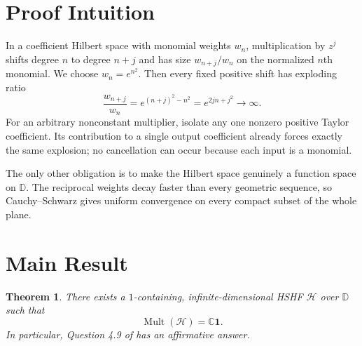 \documentclass[11pt]{article}
\newtheorem{theorem}{Theorem}
\theoremstyle{definition}
\theoremstyle{remark}
\newcommand{\C}{\mathbb C}
\newcommand{\D}{\mathbb D}
\newcommand{\Hcal}{\mathcal H}
\newcommand{\Mult}{\operatorname{Mult}}
\begin{document}
\section*{Proof Intuition}

In a coefficient Hilbert space with monomial weights $w_n$, multiplication by
$z^j$ shifts degree $n$ to degree $n+j$ and has size $w_{n+j}/w_n$ on the
normalized $n$th monomial.  We choose $w_n=e^{n^2}$.  Then every fixed
positive shift has exploding ratio
\[
  \frac{w_{n+j}}{w_n}=e^{(n+j)^2-n^2}=e^{2jn+j^2}\longrightarrow\infty.
\]
For an arbitrary nonconstant multiplier, isolate any one nonzero positive
Taylor coefficient.  Its contribution to a single output coefficient already
forces exactly the same explosion; no cancellation can occur because each
input is a monomial.

The only other obligation is to make the Hilbert space genuinely a function
space on $\D$.  The reciprocal weights decay faster than every geometric
sequence, so Cauchy--Schwarz gives uniform convergence on every compact subset
of the whole plane.

\section*{Main Result}

\begin{theorem}\label{thm:main}
There exists a $1$-containing, infinite-dimensional HSHF $\Hcal$ over $\D$
such that
\[
  \Mult(\Hcal)=\C\mathbf 1.
\]
In particular, Question 4.9 of \cite{Bilokopytov2020} has an affirmative
answer.
\end{theorem}
\end{document}
